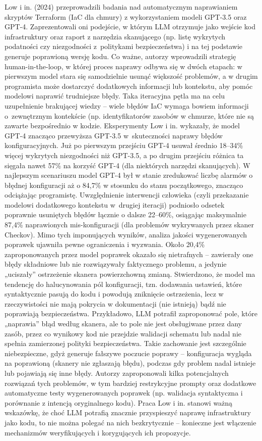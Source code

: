 Low i in. (2024) przeprowadzili badania nad automatycznym naprawianiem skryptów Terraform (IaC dla chmury) z wykorzystaniem modeli GPT-3.5 oraz GPT-4. Zaprezentowali oni podejście, w którym LLM otrzymuje jako wejście kod infrastruktury oraz raport z narzędzia skanującego (np. listę wykrytych podatności czy niezgodności z politykami bezpieczeństwa) i na tej podstawie generuje poprawioną wersję kodu. Co ważne, autorzy wprowadzili strategię human-in-the-loop, w której proces naprawy odbywa się w dwóch etapach: w pierwszym model stara się samodzielnie usunąć większość problemów, a w drugim programista może dostarczyć dodatkowych informacji lub kontekstu, aby pomóc modelowi naprawić trudniejsze błędy. Taka iteracyjna pętla ma na celu uzupełnienie brakującej wiedzy – wiele błędów IaC wymaga bowiem informacji o zewnętrznym kontekście (np. identyfikatorów zasobów w chmurze, które nie są zawarte bezpośrednio w kodzie. Eksperymenty Low i in. wykazały, że model GPT-4 znacząco przewyższa GPT-3.5 w skuteczności naprawy błędów konfiguracyjnych. Już po pierwszym przejściu GPT-4 usuwał średnio 18–34\% więcej wykrytych niezgodności niż GPT-3.5, a po drugim przejściu różnica ta sięgała nawet 57\% na korzyść GPT-4 (dla niektórych narzędzi skanujących). W najlepszym scenariuszu model GPT-4 był w stanie zredukować liczbę alarmów o błędnej konfiguracji aż o 84,7\% w stosunku do stanu początkowego, znacząco odciążając programistę. Uwzględnienie interwencji człowieka (czyli przekazanie modelowi dodatkowego kontekstu w drugiej iteracji) podniosło odsetek poprawnie usuniętych błędów łącznie o dalsze 22–60\%, osiągając maksymalnie 87,4\% naprawionych mis-konfiguracji (dla problemów wykrywanych przez skaner Checkov). Mimo tych imponujących wyników, analiza jakości wygenerowanych poprawek ujawniła pewne ograniczenia i wyzwania. Około 20,4\% zaproponowanych przez model poprawek okazało się nietrafnych – zawierały one błędy składniowe lub nie rozwiązywały faktycznego problemu, a jedynie „uciszały” ostrzeżenie skanera powierzchowną zmianą. Stwierdzono, że model ma tendencję do halucynowania pól konfiguracji, tzn. dodawania ustawień, które syntaktycznie pasują do kodu i powodują zniknięcie ostrzeżenia, lecz w rzeczywistości nie mają pokrycia w dokumentacji (nie istnieją) bądź nie poprawiają bezpieczeństwa. Przykładowo, LLM potrafił zaproponować pole, które „naprawia” błąd według skanera, ale to pole nie jest obsługiwane przez dany zasób, przez co wynikowy kod nie przejdzie walidacji schematu lub nadal nie spełnia zamierzonej polityki bezpieczeństwa. Takie zachowanie jest szczególnie niebezpieczne, gdyż generuje fałszywe poczucie poprawy – konfiguracja wygląda na poprawioną (skanery nie zgłaszają błędu), podczas gdy problem nadal istnieje lub pojawiają się inne błędy. Autorzy zaproponowali kilka potencjalnych rozwiązań tych problemów, w tym bardziej restrykcyjne prompty oraz dodatkowe automatyczne testy wygenerowanych poprawek (np. walidacja syntaktyczna i porównanie z intencją oryginalnego kodu). Praca Low i in. stanowi ważną wskazówkę, że choć LLM potrafią znacznie przyspieszyć naprawę infrastruktury jako kodu, to nie można polegać na nich bezkrytycznie – konieczne jest włączenie mechanizmów weryfikujących i korygujących ich propozycje.

